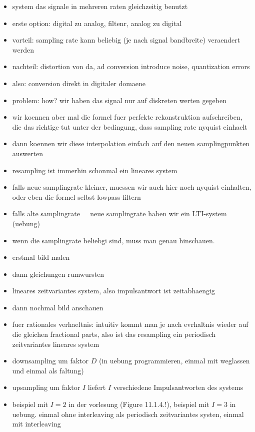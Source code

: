 \begin{itemize}
    \item system das signale in mehreren raten gleichzeitig benutzt
    \item erste option: digital zu analog, filtenr, analog zu digital
    \item vorteil: sampling rate kann beliebig (je nach signal bandbreite) veraendert werden
    \item nachteil: distortion von da, ad conversion introduce noise, quantization errors
    \item also: conversion direkt in digitaler domaene
    \item problem: how? wir haben das signal nur auf diskreten werten gegeben
    \item wir koennen aber mal die formel fuer perfekte rekonstruktion aufschreiben, die das richtige tut unter der bedingung, dass sampling rate nyquist einhaelt
    \item dann koennen wir diese interpolation einfach auf den neuen samplingpunkten auswerten
    \item resampling ist immerhin schonmal ein lineares system
    \item falls neue samplingrate kleiner, muessen wir auch hier noch nyquist einhalten, oder eben die formel selbst lowpass-filtern
    \item falls alte samplingrate = neue samplingrate haben wir ein LTI-system (uebung)
    \item wenn die samplingrate beliebgi sind, muss man genau hinschauen.
    \item erstmal bild malen
    \item dann gleichungen rumwursten
    \item lineares zeitvariantes system, also impulsantwort ist zeitabhaengig
    \item dann nochmal bild anschauen
    \item fuer rationales verhaeltnis: intuitiv kommt man je nach evrhaltnis wieder auf die gleichen fractional parts, also ist das resampling ein periodisch zeitvariantes lineares system 
    \item downsampling um faktor $D$ (in uebung programmieren, einmal mit weglassen und einmal als faltung)
    \item upsampling um faktor $I$ liefert $I$ verschiedene Impulsantworten des systems
    \item beispiel mit $I = 2$ in der vorlesung (Figure 11.1.4.!), beispiel mit $I = 3$ in uebung. einmal ohne interleaving als periodisch zeitvariantes systen, einmal mit interleaving
\end{itemize}
